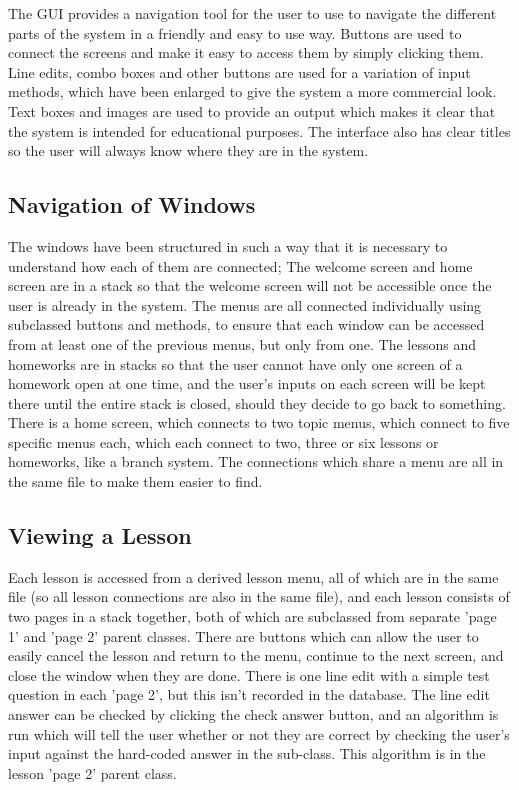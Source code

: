The GUI provides a navigation tool for the user to use to navigate the different parts of the system in a friendly and easy to use way. Buttons are used to connect the screens and make it easy to access them by simply clicking them. Line edits, combo boxes and other buttons are used for a variation of input methods, which have been enlarged to give the system a more commercial look. Text boxes and images are used to provide an output which makes it clear that the system is intended for educational purposes. The interface also has clear titles so the user will always know where they are in the system.

\subsection{Navigation of Windows}

The windows have been structured in such a way that it is necessary to understand how each of them are connected; The welcome screen and home screen are in a stack so that the welcome screen will not be accessible once the user is already in the system. The menus are all connected individually using subclassed buttons and methods, to ensure that each window can be accessed from at least one of the previous menus, but only from one. The lessons and homeworks are in stacks so that the user cannot have only one screen of a homework open at one time, and the user's inputs on each screen will be kept there until the entire stack is closed, should they decide to go back to something. There is a home screen, which connects to two topic menus, which connect to five specific menus each, which each connect to two, three or six lessons or homeworks, like a branch system. The connections which share a menu are all in the same file to make them easier to find.

\subsection{Viewing a Lesson}

Each lesson is accessed from a derived lesson menu, all of which are in the same file (so all lesson connections are also in the same file), and each lesson consists of two pages in a stack together, both of which are subclassed from separate 'page 1' and 'page 2' parent classes. There are buttons which can allow the user to easily cancel the lesson and return to the menu, continue to the next screen, and close the window when they are done. There is one line edit with a simple test question in each 'page 2', but this isn't recorded in the database. The line edit answer can be checked by clicking the check answer button, and an algorithm is run which will tell the user whether or not they are correct by checking the user's input against the hard-coded answer in the sub-class. This algorithm is in the lesson 'page 2' parent class.

